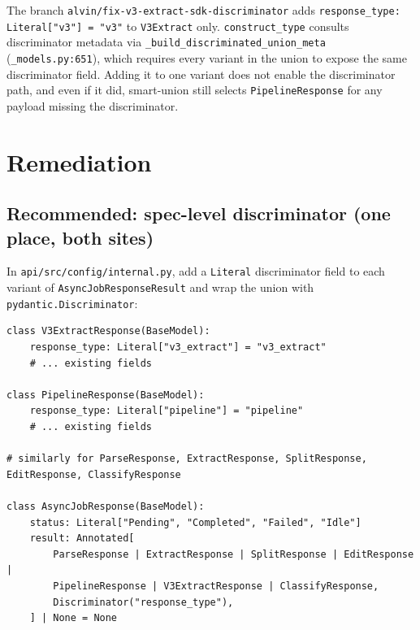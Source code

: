 \documentclass[11pt]{article}
\begin{document}
The branch \texttt{alvin/fix-v3-extract-sdk-discriminator} adds \texttt{response\_type: Literal["v3"] = "v3"} to \texttt{V3Extract} only. \texttt{construct\_type} consults discriminator metadata via \texttt{\_build\_discriminated\_union\_meta} (\texttt{\_models.py:651}), which requires every variant in the union to expose the same discriminator field. Adding it to one variant does not enable the discriminator path, and even if it did, smart-union still selects \texttt{PipelineResponse} for any payload missing the discriminator.

\section{Remediation}

\subsection{Recommended: spec-level discriminator (one place, both sites)}

In \texttt{api/src/config/internal.py}, add a \texttt{Literal} discriminator field to each variant of \texttt{AsyncJobResponseResult} and wrap the union with \texttt{pydantic.Discriminator}:

\begin{lstlisting}[style=py]
class V3ExtractResponse(BaseModel):
    response_type: Literal["v3_extract"] = "v3_extract"
    # ... existing fields

class PipelineResponse(BaseModel):
    response_type: Literal["pipeline"] = "pipeline"
    # ... existing fields

# similarly for ParseResponse, ExtractResponse, SplitResponse, EditResponse, ClassifyResponse

class AsyncJobResponse(BaseModel):
    status: Literal["Pending", "Completed", "Failed", "Idle"]
    result: Annotated[
        ParseResponse | ExtractResponse | SplitResponse | EditResponse |
        PipelineResponse | V3ExtractResponse | ClassifyResponse,
        Discriminator("response_type"),
    ] | None = None
\end{lstlisting}
\end{document}
